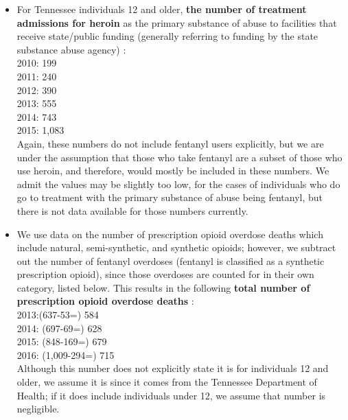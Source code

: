 \documentclass[12pt]{article}
\begin{document}
\begin{itemize}

\item For Tennessee individuals 12 and older, \textbf{the number of treatment admissions for heroin} as the primary substance of abuse to facilities that receive state/public funding (generally referring to funding by the state substance abuse agency) \cite{TEDS2015_SAMSHA_admissions}: \\
2010: 199\\
2011: 240 \\
2012: 390 \\
2013: 555 \\
2014: 743 \\
2015: 1,083 \\


Again, these numbers do not include fentanyl users explicitly, but we are under the assumption that those who take fentanyl are a subset of those who use heroin, and therefore, would mostly be included in these numbers. We admit the values may be slightly too low, for the cases of individuals who do go to treatment with the primary substance of abuse being fentanyl, but there is not data available for those numbers currently. 



\item We use data on the number of prescription opioid overdose deaths which include natural, semi-synthetic, and synthetic opioids; however, we subtract out the number of fentanyl overdoses (fentanyl is classified as a synthetic prescription opioid), since those overdoses are counted for in their own category, listed below. This results in the following  \textbf{total number of prescription opioid overdose deaths} \cite{PDO}: \\
2013:(637-53=) 584 \\
2014: (697-69=) 628 \\
2015: (848-169=) 679 \\
2016: (1,009-294=) 715 \\

Although this number does not explicitly state it is for individuals 12 and older, we assume it is since it comes from the Tennessee Department of Health; if it does include individuals under 12, we assume that number is negligible. \\


\end{itemize}
\end{document}
